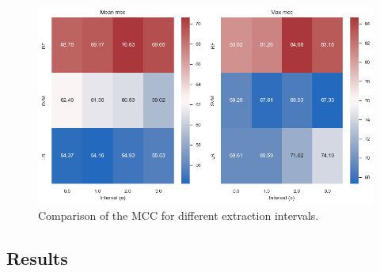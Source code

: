 \begin{figure}[H]
    \centering
    \includegraphics[width=1\columnwidth]{./images/interval_impact_mcc.png}
    \caption{Comparison of the MCC for different extraction intervals.}
    \label{fig:interval_impact_mcc}
\end{figure}


\subsection{Results}

